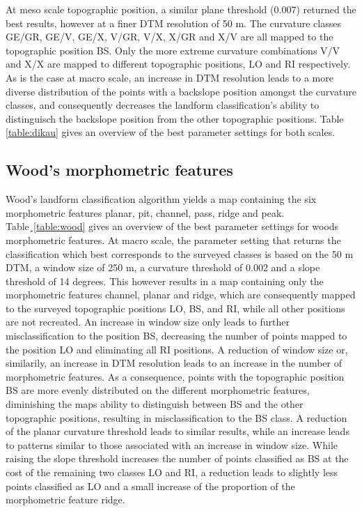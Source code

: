 \documentclass[preprint,12pt,authoryear]{elsarticle}
\begin{document}
At meso scale topographic position, a similar plane threshold (0.007) returned the best results, however at a finer DTM resolution of 50 m. The curvature classes GE/GR, GE/V, GE/X, V/GR, V/X, X/GR and X/V are all mapped to the topographic position BS. Only the more extreme curvature combinations V/V and X/X are mapped to different topographic positions, LO and RI respectively. As is the case at macro scale, an increase in DTM resolution leads to a more diverse distribution of the points with a backslope position amongst the curvature classes, and consequently decreases the landform classification's ability to distinguisch the backslope position from the other topographic positions. Table \ref{table:dikau} gives an overview of the best parameter settings for both scales.

\subsection{Wood's morphometric features}
Wood's landform classification algorithm yields a map containing the six morphometric features planar, pit, channel, pass, ridge and peak. Table¸\ref{table:wood} gives an overview of the best parameter settings for woods morphometric features.
At macro scale, the parameter setting that returns the classification which best corresponds to the surveyed classes is based on the 50 m DTM, a window size of 250 m, a curvature threshold of 0.002 and a slope threshold of 14 degrees. This however results in a map containing only the morphometric features channel, planar and ridge, which are consequently mapped to the surveyed topographic positions LO, BS, and RI, while all other positions are not recreated. An increase in window size only leads to further misclassification to the position BS, decreasing the number of points mapped to the position LO and eliminating all RI positions. A reduction of window size or, similarily, an increase in DTM resolution leads to an increase in the number of morphometric features. As a consequence, points with the topographic position BS are more evenly distributed on the different morphometric features, diminishing the maps ability to distinguish between BS and the other topographic positions, resulting in misclassification to the BS class. A reduction of the planar curvature threshold leads to similar results, while an increase leads to patterns similar to those associated with an increase in window size. While raising the slope threshold increases the number of points classified as BS at the cost of the remaining two classes LO and RI, a reduction leads to slightly less points classified as LO and a small increase of the proportion of the morphometric feature ridge. 
\end{document}
